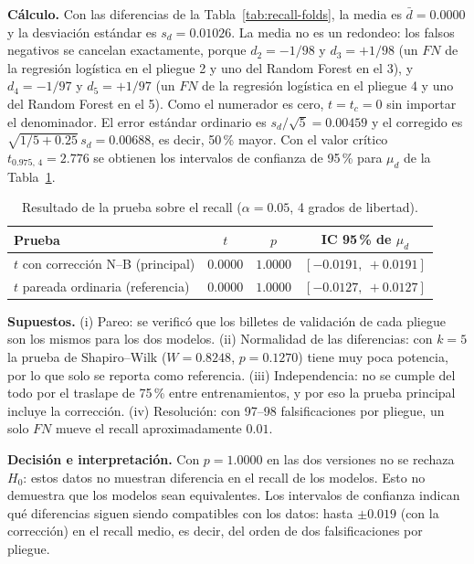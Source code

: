 \documentclass[conference]{IEEEtran}
\begin{document}
	\textbf{Cálculo.} Con las diferencias de la Tabla~\ref{tab:recall-folds}, la media es $\bar d=0.0000$ y la desviación estándar es $s_d=0.01026$. La media no es un redondeo: los falsos negativos se cancelan exactamente, porque $d_2=-1/98$ y $d_3=+1/98$ (un $FN$ de la regresión logística en el pliegue 2 y uno del Random Forest en el 3), y $d_4=-1/97$ y $d_5=+1/97$ (un $FN$ de la regresión logística en el pliegue 4 y uno del Random Forest en el 5). Como el numerador es cero, $t=t_c=0$ sin importar el denominador. El error estándar ordinario es $s_d/\sqrt{5}=0.00459$ y el corregido es $\sqrt{1/5+0.25}\,s_d=0.00688$, es decir, 50\,\% mayor. Con el valor crítico $t_{0.975,\,4}=2.776$ se obtienen los intervalos de confianza de 95\,\% para $\mu_d$ de la Tabla~\ref{tab:prueba}.
	
	\begin{table}[t]
		\centering
		\caption{Resultado de la prueba sobre el recall ($\alpha=0.05$, 4 grados de libertad).}
		\label{tab:prueba}
		\footnotesize
		\begin{tabular}{@{}lccc@{}}
			\toprule
			Prueba & $t$ & $p$ & IC 95\,\% de $\mu_d$ \\
			\midrule
			$t$ con corrección N--B (principal) & $0.0000$ & $1.0000$ & $[-0.0191,\ +0.0191]$ \\
			$t$ pareada ordinaria (referencia) & $0.0000$ & $1.0000$ & $[-0.0127,\ +0.0127]$ \\
			\bottomrule
		\end{tabular}
	\end{table}
	
	\textbf{Supuestos.} (i) Pareo: se verificó que los billetes de validación de cada pliegue son los mismos para los dos modelos. (ii) Normalidad de las diferencias: con $k=5$ la prueba de Shapiro--Wilk ($W=0.8248$, $p=0.1270$) tiene muy poca potencia, por lo que solo se reporta como referencia. (iii) Independencia: no se cumple del todo por el traslape de 75\,\% entre entrenamientos, y por eso la prueba principal incluye la corrección. (iv) Resolución: con 97--98 falsificaciones por pliegue, un solo $FN$ mueve el recall aproximadamente $0.01$.
	
	\textbf{Decisión e interpretación.} Con $p=1.0000$ en las dos versiones no se rechaza $H_0$: estos datos no muestran diferencia en el recall de los modelos. Esto no demuestra que los modelos sean equivalentes. Los intervalos de confianza indican qué diferencias siguen siendo compatibles con los datos: hasta $\pm 0.019$ (con la corrección) en el recall medio, es decir, del orden de dos falsificaciones por pliegue.
	
\end{document}
